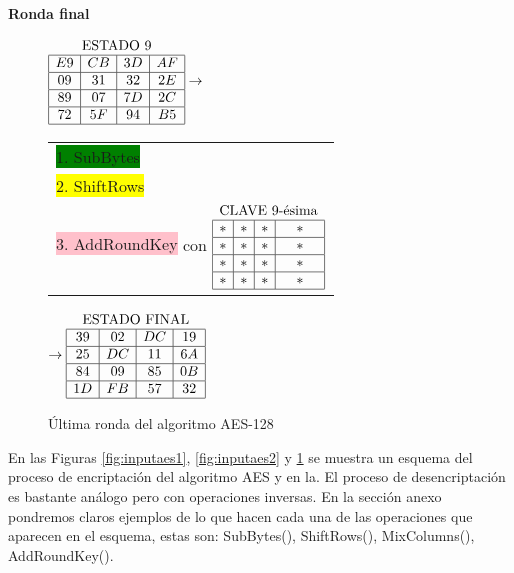 \begin{center}{\bf Ronda final}\end{center}
\begin{figure}[!ht]
\begin{figurebox}
\begin{center}
$\begin{array}{|c|c|c|c|}
\multicolumn{4}{c}{\text{ESTADO 9}}\\\hline
E9 & CB & 3D & AF\\\hline
09 & 31 & 32 & 2E\\\hline
89 & 07 & 7D & 2C\\\hline
72 & 5F & 94 & B5\\\hline
\end{array}\rightarrow$
\begin{tabular}{l}
\\
\colorbox{green}{1. SubBytes}\\
\colorbox{yellow}{2. ShiftRows}\\
\colorbox{pink}{3. AddRoundKey} con
\tiny{
$\begin{array}{|c|c|c|c|}
\multicolumn{4}{c}{\text{CLAVE  9-ésima}}\\\hline
* & * & * & *\\\hline
* & * & * & *\\\hline
* & * & * & *\\\hline
* & * & * & *\\\hline
\end{array}$
}
\\
\end{tabular} $\rightarrow
\begin{array}{|c|c|c|c|}
\multicolumn{4}{c}{\text{ESTADO FINAL}}\\\hline
39 & 02 & DC & 19\\\hline
25 & DC & 11 & 6A\\\hline
84 & 09 & 85 & 0B\\\hline
1D & FB & 57 & 32\\\hline
\end{array}
$
\end{center}\caption{Última ronda del algoritmo AES-128}\label{fig:inputaes3}
\end{figurebox}
\end{figure}


En las Figuras \ref{fig:inputaes1}, \ref{fig:inputaes2} y \ref{fig:inputaes3} se muestra un esquema del proceso de encriptación del algoritmo AES  y en la. El proceso de desencriptación es bastante análogo pero con operaciones inversas. En la sección anexo pondremos claros ejemplos de lo que hacen cada una de las operaciones que aparecen en el esquema, estas son: SubBytes(), ShiftRows(), MixColumns(), AddRoundKey().

